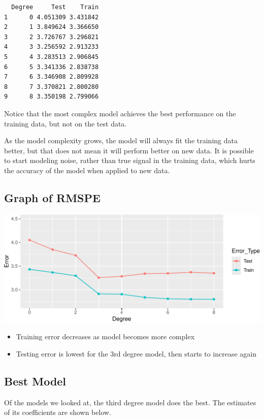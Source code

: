 \documentclass[
  letterpaper,
  DIV=11,
  numbers=noendperiod]{scrreprt}
\providecommand{\tightlist}{%
  \setlength{\itemsep}{0pt}\setlength{\parskip}{0pt}}\usepackage{longtable,booktabs,array}
\begin{document}
\begin{verbatim}
  Degree     Test    Train
1      0 4.051309 3.431842
2      1 3.849624 3.366650
3      2 3.726767 3.296821
4      3 3.256592 2.913233
5      4 3.283513 2.906845
6      5 3.341336 2.838738
7      6 3.346908 2.809928
8      7 3.370821 2.800280
9      8 3.350198 2.799066
\end{verbatim}

Notice that the most complex model achieves the best performance on the
training data, but not on the test data.

As the model complexity grows, the model will always fit the training
data better, but that does not mean it will perform better on new data.
It is possible to start modeling noise, rather than true signal in the
training data, which hurts the accuracy of the model when applied to new
data.

\subsection{Graph of RMSPE}\label{graph-of-rmspe}

\includegraphics{Ch7_files/figure-pdf/unnamed-chunk-20-1.pdf}

\begin{itemize}
\tightlist
\item
  Training error decreases as model becomes more complex\\
\item
  Testing error is lowest for the 3rd degree model, then starts to
  increase again
\end{itemize}

\subsection{Best Model}\label{best-model}

Of the models we looked at, the third degree model does the best. The
estimates of its coefficients are shown below.
\end{document}
